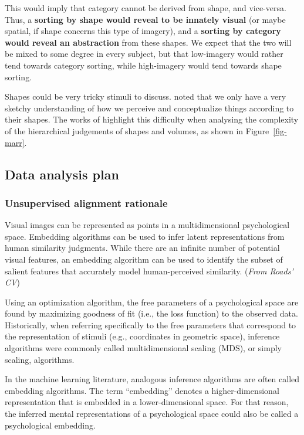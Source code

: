 \documentclass[
  authoryear]{elsarticle}
\begin{document}
This would imply that category cannot be derived from shape, and
vice-versa. Thus, a \textbf{sorting by shape would reveal to be innately
visual} (or maybe spatial, if shape concerns this type of imagery), and
a \textbf{sorting by category would reveal an abstraction} from these
shapes. We expect that the two will be mixed to some degree in every
subject, but that low-imagery would rather tend towards category
sorting, while high-imagery would tend towards shape sorting.

Shapes could be very tricky stimuli to discuss. \citet{gardenfors2004}
noted that we only have a very sketchy understanding of how we perceive
and conceptualize things according to their shapes. The works of
\citet{marr1997} highlight this difficulty when analysing the complexity
of the hierarchical judgements of shapes and volumes, as shown in
Figure~\ref{fig-marr}.

\subsection{Data analysis plan}\label{data-analysis-plan}

\subsubsection{Unsupervised alignment
rationale}\label{unsupervised-alignment-rationale}

Visual images can be represented as points in a multidimensional
psychological space. Embedding algorithms can be used to infer latent
representations from human similarity judgments. While there are an
infinite number of potential visual features, an embedding algorithm can
be used to identify the subset of salient features that accurately model
human-perceived similarity. (\emph{From Roads' CV})

Using an optimization algorithm, the free parameters of a psychological
space are found by maximizing goodness of fit (i.e., the loss function)
to the observed data. Historically, when referring specifically to the
free parameters that correspond to the representation of stimuli (e.g.,
coordinates in geometric space), inference algorithms were commonly
called multidimensional scaling (MDS), or simply scaling, algorithms.

In the machine learning literature, analogous inference algorithms are
often called embedding algorithms. The term ``embedding'' denotes a
higher-dimensional representation that is embedded in a
lower-dimensional space. For that reason, the inferred mental
representations of a psychological space could also be called a
psychological embedding.
\end{document}
